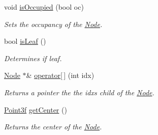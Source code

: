 \begin{DoxyCompactItemize}
\item 
void \hyperlink{classsuturo__octree_1_1Node_a79a8372a6a141a9b26817a059da3ee53}{is\-Occupied} (bool oc)
\begin{DoxyCompactList}\small\item\em Sets the occupancy of the \hyperlink{classsuturo__octree_1_1Node}{Node}. \end{DoxyCompactList}\item 
bool \hyperlink{classsuturo__octree_1_1Node_af165133c7b374ce9d7204f7fb1c61921}{is\-Leaf} ()
\begin{DoxyCompactList}\small\item\em Determines if leaf. \end{DoxyCompactList}\item 
\hyperlink{classsuturo__octree_1_1Node}{Node} $\ast$\& \hyperlink{classsuturo__octree_1_1Node_a4ba1c3546ad6966b420b9d5b8c11381d}{operator\mbox{[}$\,$\mbox{]}} (int idx)
\begin{DoxyCompactList}\small\item\em Returns a pointer the the idxs child of the \hyperlink{classsuturo__octree_1_1Node}{Node}. \end{DoxyCompactList}\item 
\hyperlink{structPoint3f}{Point3f} \hyperlink{classsuturo__octree_1_1Node_ace47b8d3f9048d75390f50b6ccde3a74}{get\-Center} ()
\begin{DoxyCompactList}\small\item\em Returns the center of the \hyperlink{classsuturo__octree_1_1Node}{Node}. \end{DoxyCompactList}\end{DoxyCompactItemize}
